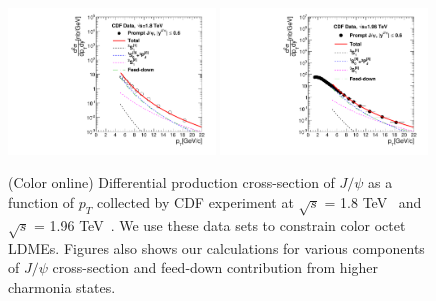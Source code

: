 \documentclass[aps,prc,preprint,superscriptaddress,showpacs,showkeys,amsmath]{revtex4-1}
\begin{document}
\begin{figure}
\includegraphics[width=0.49\textwidth]{Figures/JPsi/CDF_RootS180TeV_D2NDPtDy_PromptJPsi_Y0006_Pt.pdf}
\includegraphics[width=0.49\textwidth]{Figures/JPsi/CDF_196TeV_D2NDPtDy_PromptJPsi_Y0006_Pt.pdf}
\caption{(Color online) Differential production cross-section of $J/\psi$ 
as a function of $p_{T}$ collected by CDF experiment at  $\sqrt{s}$ = 1.8 TeV~\cite{Abe:1997jz}
and $\sqrt{s}$ = 1.96 TeV~\cite{Acosta:2004yw}. We use these data sets to constrain color octet LDMEs. 
Figures also shows our calculations for various components 
of $J/\psi$ cross-section and feed-down contribution from higher charmonia states.}
\label{Fig:LDMEJPsiCDF}
\end{figure}
\end{document}
